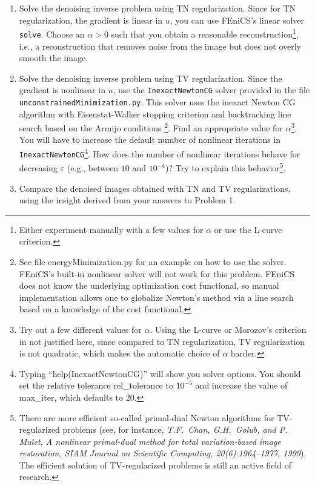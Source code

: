 \documentclass[12pt]{article}
\begin{document}
\begin{enumerate}
\begin{enumerate}
\item Solve the denoising inverse problem using TN
  regularization. Since for TN regularization, the gradient is linear
  in $u$, you can use FEniCS's linear solver \verb+solve+. Choose an
  $\alpha>0$ such that you obtain a reasonable
  reconstruction\footnote{Either experiment manually with a few values
    for $\alpha$ or use the L-curve criterion.}, i.e.,
  a reconstruction that removes noise from the image but does not
  overly smooth the image.

\item Solve the denoising inverse problem using TV
  regularization. Since the gradient is nonlinear in $u$, use the
  \verb+InexactNewtonCG+ solver provided in the file \verb+unconstrainedMinimization.py+.
  This solver uses the inexact Newton CG algorithm with Eisenstat-Walker stopping criterion
  and backtracking line search based on the Armijo conditions
  \footnote{See file {\ttfamily energyMinimization.py} for an example on how to use the solver. 
  FEniCS's built-in nonlinear solver will not
    work for this problem. FEniCS does not know the
    underlying optimization cost functional, so manual implementation
    allows one to globalize Newton's method via a line search based on
    a knowledge of the cost functional.}. Find an appropriate value
  for $\alpha$\footnote{Try out a few different values for
    $\alpha$. Using the L-curve or Morozov's criterion in not
    justified here, since compared to TN regularization, TV
    regularization is not quadratic, which makes the automatic choice
    of $\alpha$ harder.}. You will have to increase the default number
  of nonlinear iterations in \verb+InexactNewtonCG+\footnote{Typing
    ``{\ttfamily help(InexactNewtonCG)}'' will show you solver options. You
    should set the relative tolerance {\ttfamily rel\_tolerance} to $10^{-5}$ and increase the value of {\ttfamily max\_iter}, which defaults
    to 20.}. How does the number of nonlinear iterations behave for
  decreasing $\varepsilon$ (e.g., between $10$ and $10^{-4}$)? Try to
  explain this behavior\footnote{There are more efficient so-called
    primal-dual Newton algorithms for TV-regularized problems (see,
    for instance, {\em T.F.\ Chan, G.H.\ Golub, and P. Mulet,
      A nonlinear primal-dual method for total variation-based image
      restoration, SIAM Journal on Scientific Computing,
      20(6):1964--1977, 1999}). The efficient solution of
    TV-regularized problems is still an active field of research.}.

\item Compare the denoised images obtained with TN and TV
  regularizations, using the insight derived from your answers to
  Problem 1.


\end{enumerate}
\end{enumerate}
\end{document}
